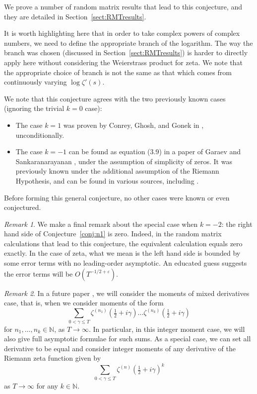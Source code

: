 \documentclass[12pt,a4paper,reqno]{amsart}
\theoremstyle{remark}
\newtheorem*{remark}{Remark}
\numberwithin{equation}{section}
\begin{document}
We prove a number of random matrix results that lead to this conjecture, and they are detailed in Section~\ref{sect:RMTresults}. 

It is worth highlighting here that in order to take complex powers of complex numbers, we need to define the appropriate branch of the logarithm. The way the branch was chosen (discussed in Section~\ref{sect:RMTresults}) is harder to directly apply here without considering the Weierstrass product for zeta. We note that the appropriate choice of branch is not the same as that which comes from continuously varying $\log\zeta'(s)$.


We note that this conjecture agrees with the two previously known cases (ignoring the trivial $k=0$ case): 
\begin{itemize}
    \item The case $k=1$ was proven by Conrey, Ghosh, and Gonek in \cite{CGG88}, unconditionally.
    \item The case $k=-1$ can be found as equation (3.9) in a paper of Garaev and Sankaranarayanan \cite{GarSan06}, under the assumption of simplicity of zeros. It was previously known under the additional assumption of the Riemann Hypothesis, and can be found in various sources, including  \cite{ingham1942two,MV2007,milinovich2012}. 
\end{itemize}

Before forming this general conjecture, no other cases were known or even conjectured.

\begin{remark}
    We make a final remark about the special case when $k=-2$: the right hand side of Conjecture~\ref{conj:n1} is zero. Indeed, in the random matrix calculations that lead to this conjecture, the equivalent calculation equals zero exactly. In the case of zeta, what we mean is the left hand side is bounded by some error terms with no leading-order asymptotic. An educated guess suggests the error terms will be $O(T^{-1/2+\varepsilon})$. 
\end{remark}

\begin{remark}
    In a future paper \cite{HPC}, we will consider the moments of mixed derivatives case, that is, when we consider moments of the form
\[
\sum_{0 < \gamma \leq T} \zeta^{(n_1)} \left( \tfrac{1}{2} + i \gamma \right)\dots\zeta^{(n_k)} \left( \tfrac{1}{2} + i \gamma \right)
\]
for $n_1,\dots,n_k \in \mathbb{N}$, as $T \rightarrow \infty$. In particular, in this integer moment case, we will also give full asymptotic formulae for such sums.  As a special case, we can set all derivative to be equal and consider integer moments of any derivative of the Riemann zeta function given by
\[
\sum_{0 < \gamma \leq T} \zeta^{(n)} \left(\tfrac{1}{2} + i \gamma  \right)^{k}
\]
as $T \rightarrow \infty$ for any $k \in \mathbb{N}$.
\end{remark}
\end{document}

